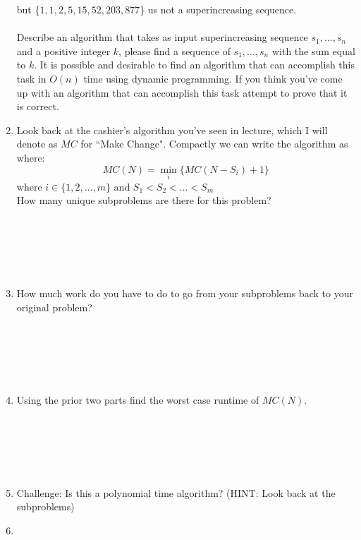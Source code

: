 \documentclass[12pt]{article}
\begin{document}
\begin{enumerate}
    but \{$1,1,2,5,15,52,203,877$\} us not a superincreasing sequence.\\\\
    Describe an algorithm that takes as input superincreasing sequence $s_1,\dots,s_n$ and a positive 
    integer $k$, please find a sequence of $s_1,\dots,s_n$ with the sum equal
    to $k$. It is possible and desirable to find an algorithm that can accomplish this
    task in $O(n)$ time using dynamic programming. If you think you've come up with an
    algorithm that can accomplish this task attempt to prove that it is correct.
    \newpage
    \item Look back at the cashier's algorithm you've seen in lecture, which I will denote as $MC$ for 
    ``Make Change". Compactly we can write the algorithm as where:
    $$MC(N) = \min_{i}\{MC(N-S_i)+1\}$$
    where $i \in \{1,2,\dots,m\}$ and $S_1<S_2<\dots<S_m$
    \\
    How many unique subproblems are there for this problem?\\\\\\\\\\\\
    \item How much work do you have to do to go from your subproblems back to your original problem?\\\\\\\\\\\
    \item Using the prior two parts find the worst case runtime of $MC(N)$.\\\\\\\\\\\\
    \item Challenge: Is this a polynomial time algorithm? (HINT: Look back at the subproblems)
    \newpage
    \item 
\end{enumerate}
\end{document}
